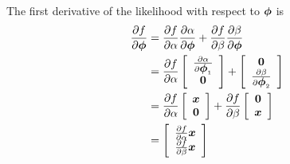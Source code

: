 The first derivative of the likelihood with respect to $\mbox{$\boldsymbol{\phi}$}$ is
\begin{align*}
\frac{\partial f}{\partial \mbox{$\boldsymbol{\phi}$}} &=
\frac{\partial f}{\partial \alpha}
\frac{\partial \alpha}{\partial \mbox{$\boldsymbol{\phi}$}} +
\frac{\partial f}{\partial \beta}
\frac{\partial \beta}{\partial \mbox{$\boldsymbol{\phi}$}} \\
 &= \frac{\partial f}{\partial \alpha} \left [
    \begin{array}{c}
    \frac{\partial \alpha}{\partial \mbox{$\boldsymbol{\phi}$}_1} \\ \mbox{$\boldsymbol{0}$}
    \end{array} \right ] + \left [
    \begin{array}{c}
    \mbox{$\boldsymbol{0}$} \\
    \frac{\partial \beta}{\partial \mbox{$\boldsymbol{\phi}$}_2}
    \end{array} \right ] \\
 &= \frac{\partial f}{\partial \alpha} \left [
    \begin{array}{c} \mbox{$\boldsymbol{x}$} \\ \mbox{$\boldsymbol{0}$} \end{array} \right ] +
    \frac{\partial f}{\partial \beta} \left [
    \begin{array}{c} \mbox{$\boldsymbol{0}$} \\ \mbox{$\boldsymbol{x}$} \end{array} \right ] \\
 &= \left [ \begin{array}{c}
    \frac{\partial f}{\partial \alpha} \mbox{$\boldsymbol{x}$} \\
    \frac{\partial f}{\partial \beta} \mbox{$\boldsymbol{x}$}
    \end{array} \right ]
\end{align*}

